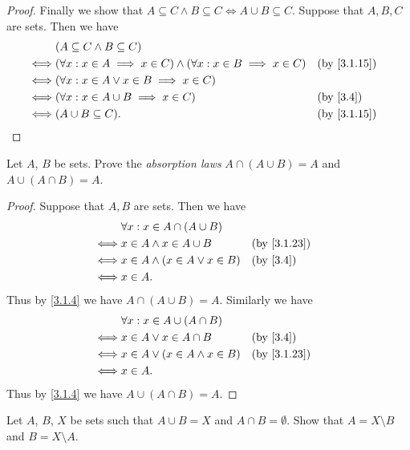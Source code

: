 \begin{proof}
	Finally we show that \(A \subseteq C \land B \subseteq C \iff A \cup B \subseteq C\).
	Suppose that \(A, B, C\) are sets.
	Then we have
	\begin{align*}
		     & (A \subseteq C \land B \subseteq C)                                                                  \\
		\iff & (\forall x : x \in A \implies x \in C) \land (\forall x : x \in B \implies x \in C) &  & \by{3.1.15} \\
		\iff & (\forall x : x \in A \lor x \in B \implies x \in C)                                                  \\
		\iff & (\forall x : x \in A \cup B \implies x \in C)                                       &  & \by{3.4}    \\
		\iff & (A \cup B \subseteq C).                                                             &  & \by{3.1.15}
	\end{align*}
\end{proof}

\begin{ex}\label{ex:3.1.8}
	Let \(A\), \(B\) be sets.
	Prove the \emph{absorption laws} \(A \cap (A \cup B) = A\) and \(A \cup (A \cap B) = A\).
\end{ex}

\begin{proof}
	Suppose that \(A, B\) are sets.
	Then we have
	\begin{align*}
		     & \forall x : x \in A \cap (A \cup B)                   \\
		\iff & x \in A \land x \in A \cup B         &  & \by{3.1.23} \\
		\iff & x \in A \land (x \in A \lor x \in B) &  & \by{3.4}    \\
		\iff & x \in A.
	\end{align*}
	Thus by \cref{3.1.4} we have \(A \cap (A \cup B) = A\).
	Similarly we have
	\begin{align*}
		     & \forall x : x \in A \cup (A \cap B)                   \\
		\iff & x \in A \lor x \in A \cap B          &  & \by{3.4}    \\
		\iff & x \in A \lor (x \in A \land x \in B) &  & \by{3.1.23} \\
		\iff & x \in A.
	\end{align*}
	Thus by \cref{3.1.4} we have \(A \cup (A \cap B) = A\).
\end{proof}

\begin{ex}\label{ex:3.1.9}
	Let \(A\), \(B\), \(X\) be sets such that \(A \cup B = X\) and \(A \cap B = \emptyset\).
	Show that \(A = X \setminus B\) and \(B = X \setminus A\).
\end{ex}

